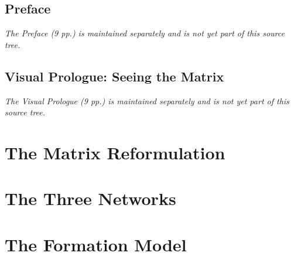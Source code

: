 \documentclass[12pt,a4paper,openright,twoside]{book}
\begin{document}
\frontmatter
\tableofcontents
{}


\mainmatter
{}
\chapter*{Preface}
\textit{The Preface (9 pp.) is maintained separately and is not yet part of this source tree.}

\chapter*{Visual Prologue: Seeing the Matrix}
\textit{The Visual Prologue (9 pp.) is maintained separately and is not yet part of this source tree.}

\part{The Matrix Reformulation}





\part{The Three Networks}





\part{The Formation Model}




\end{document}
